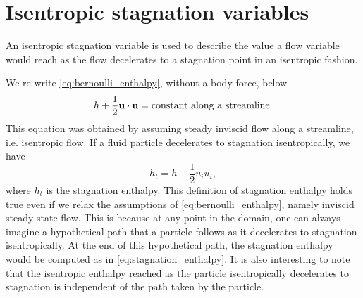 \documentclass[oneside,a4paper,11pt]{report}
\begin{document}
\section{Isentropic stagnation variables}
An isentropic stagnation variable is used to describe the value a flow variable would reach as the flow decelerates to a stagnation point in an isentropic fashion.

We re-write \cref{eq:bernoulli_enthalpy}, without a body force, below 
\begin{equation}
    h + \frac{1}{2} \mathbf{u} \cdot \mathbf{u} = \text{constant along a streamline}.
\end{equation}
This equation was obtained by assuming steady inviscid flow along a streamline, i.e. isentropic flow. If a fluid particle decelerates to stagnation isentropically, we have
\begin{equation}
\label{eq:stagnation_enthalpy}
    h_t = h + \frac{1}{2} u_i u_i,
\end{equation}
where $h_t$ is the stagnation enthalpy. This definition of stagnation enthalpy holds true even if we relax the assumptions of \cref{eq:bernoulli_enthalpy}, namely inviscid steady-state flow. This is because at any point in the domain, one can always imagine a hypothetical path that a particle follows as it decelerates to stagnation isentropically. At the end of this hypothetical path, the stagnation enthalpy would be computed as in \cref{eq:stagnation_enthalpy}. It is also interesting to note that the isentropic enthalpy reached as the particle isentropically decelerates to stagnation is independent of the path taken by the particle.

\end{document}
